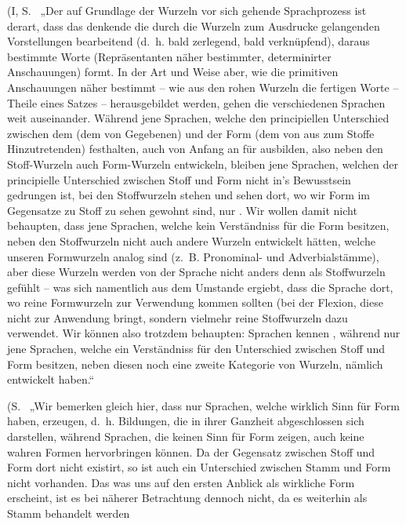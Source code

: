 (I, S.~ „Der auf Grundlage der Wurzeln vor sich gehende Sprachprozess \label{sp.338} ist derart, dass das denkende  die durch die Wurzeln zum Ausdrucke gelangenden Vorstellungen bearbeitend (d.~h. bald zerlegend, bald  verknüpfend), daraus bestimmte Worte (Repräsentanten näher be\label{fp.194}stimmter, determinirter Anschauungen) formt. In der Art und Weise aber, wie die primitiven Anschauungen näher bestimmt – wie aus den rohen Wurzeln die fertigen Worte – Theile eines Satzes – herausgebildet werden, gehen die verschiedenen Sprachen weit auseinander. Während jene Sprachen, welche den principiellen Unterschied zwischen dem  (dem von  Gegebenen) und der Form (dem von  aus zum Stoffe Hinzutretenden) festhalten, auch von Anfang an  für  ausbilden, also neben den Stoff-Wurzeln auch Form-Wurzeln entwickeln, bleiben jene Sprachen, welchen der principielle Unterschied zwischen Stoff und Form nicht in’s Bewusstsein gedrungen ist, bei den Stoffwurzeln stehen und sehen dort, wo wir Form im Gegensatze zu Stoff zu sehen gewohnt sind, nur . Wir wollen damit nicht behaupten, dass jene Sprachen, welche kein Verständniss für die Form besitzen, neben den Stoffwurzeln nicht auch andere Wurzeln entwickelt hätten, welche unseren Formwurzeln analog sind (z.~B. Pronominal- und Adverbialstämme), aber diese Wurzeln werden von der Sprache nicht anders denn als Stoffwurzeln gefühlt – was sich namentlich aus dem Umstande ergiebt, dass die Sprache dort, wo reine Formwurzeln zur Verwendung kommen sollten (bei der Flexion,  diese nicht zur Anwendung bringt, sondern vielmehr reine Stoffwurzeln dazu verwendet. Wir können also trotzdem behaupten:  Sprachen kennen , während nur jene Sprachen, welche ein Verständniss für den Unterschied zwischen Stoff und Form besitzen, neben diesen noch eine zweite Kategorie von Wurzeln, nämlich  entwickelt haben.“

(S.~ „Wir bemerken gleich hier, dass nur Sprachen, welche wirklich Sinn für Form haben,  erzeugen, d.~h. Bildungen, die in ihrer Ganzheit abgeschlossen sich darstellen, während Sprachen, die keinen Sinn für Form zeigen, auch keine wahren Formen hervorbringen können. Da der Gegensatz zwischen Stoff und Form dort nicht existirt, so ist auch ein Unterschied zwischen Stamm und Form nicht vorhanden. Das was uns auf den ersten Anblick als wirkliche \label{fp.326} Form erscheint, ist es bei näherer Betrachtung dennoch nicht, da es weiterhin als Stamm behandelt werden 

